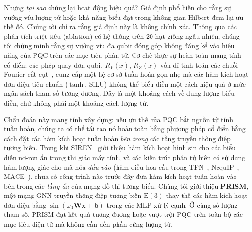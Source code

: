 \documentclass[10pt,twocolumn,letterpaper]{article}
\begin{document}
Nhưng \textit{tại sao} chúng lại hoạt động hiệu quả? Giả định phổ biến cho rằng sự vướng víu lượng tử hoặc khả năng biểu đạt trong không gian Hilbert đem lại ưu thế đó. Chúng tôi chỉ ra rằng giả định này là không chính xác. Thông qua các phân tích triệt tiêu (ablation) có hệ thống trên 20 hạt giống ngẫu nhiên, chúng tôi chứng minh rằng sự vướng víu đa qubit đóng góp không đáng kể vào hiệu năng của PQC trên các mục tiêu phân tử. Cơ chế thực sự hoàn toàn mang tính cổ điển: các phép quay đơn qubit $R_Y(x)$, $R_Z(x)$ vốn dĩ tính toán các chuỗi Fourier cắt cụt~\cite{Schuld:2020enb, Perez-Salinas:2019pjx}, cung cấp một hệ cơ sở tuần hoàn gọn nhẹ mà các hàm kích hoạt đơn điệu tiêu chuẩn ($\tanh$, SiLU) không thể biểu diễn một cách hiệu quả ở mức ngân sách tham số tương đương. Đây là một khoảng cách về dung lượng biểu diễn, chứ không phải một khoảng cách lượng tử.

Chẩn đoán này mang tính xây dựng: nếu ưu thế của PQC bắt nguồn từ tính tuần hoàn, chúng ta có thể tái tạo nó hoàn toàn bằng phương pháp cổ điển bằng cách đặt các hàm kích hoạt tuần hoàn \textit{bên trong} các tầng truyền thông điệp tương biến. Trong khi SIREN~\cite{sitzmann2020siren} giới thiệu hàm kích hoạt hình sin cho các biểu diễn nơ-ron ẩn trong thị giác máy tính, và các kiến trúc phân tử hiện có sử dụng hàm lượng giác cho mã hóa \textit{đầu vào} (hàm điều hòa cầu trong TFN~\cite{thomasTensorFieldNetworks2018}, NequIP~\cite{batznerE3equivariantGraphNeural2021}, MACE~\cite{batatiaMACEHigherOrder2022}), chưa có công trình nào trước đây đưa hàm kích hoạt tuần hoàn vào bên trong các \textit{tầng ẩn} của mạng đồ thị tương biến. Chúng tôi giới thiệu \textbf{PRISM}, một mạng GNN truyền thông điệp tương biến $\mathrm{E}(3)$ thay thế các hàm kích hoạt đơn điệu bằng $\sin(\omega_0 \mathbf{W} \mathbf{x} + \mathbf{b})$ trong các MLP xử lý cạnh. Ở cùng số lượng tham số, PRISM đạt kết quả tương đương hoặc vượt trội PQC trên toàn bộ các mục tiêu điện tử mà không cần đến phần cứng lượng tử.
\end{document}
